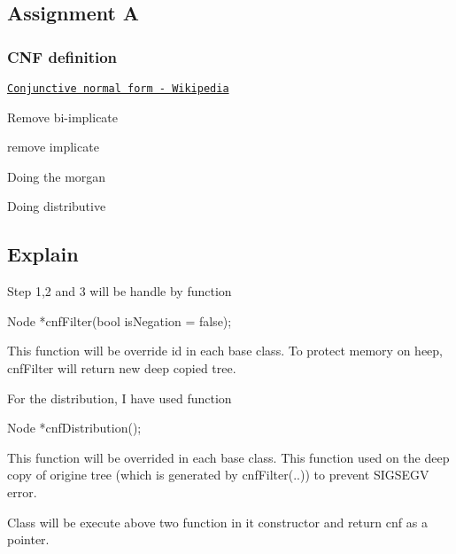 \subsection*{Assignment A}

\subsubsection*{C\+NF definition}

\href{https://en.wikipedia.org/wiki/Conjunctive_normal_form}{\tt Conjunctive normal form -\/ Wikipedia}


\begin{DoxyEnumerate}
\item Remove bi-\/implicate
\item remove implicate
\item Doing the morgan
\item Doing distributive
\end{DoxyEnumerate}

\subsection*{Explain}

Step 1,2 and 3 will be handle by function \begin{DoxyVerb}Node *cnfFilter(bool isNegation = false);
\end{DoxyVerb}


This function will be override id in each base class. To protect memory on heep, cnf\+Filter will return new deep copied tree.

For the distribution, I have used function \begin{DoxyVerb}Node *cnfDistribution();
\end{DoxyVerb}


This function will be overrided in each base class. This function used on the deep copy of origine tree (which is generated by {\ttfamily cnf\+Filter(..)}) to prevent {\ttfamily S\+I\+G\+S\+E\+GV} error.

Class will be execute above two function in it constructor and return {\ttfamily cnf} as a pointer. 